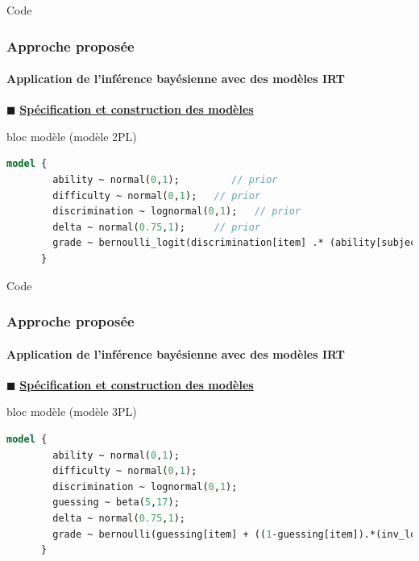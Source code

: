 \documentclass[aspectratio=169,professionalfonts, 12pt]{beamer}
\begin{document}

\begin{frame}[fragile]{Code}
  \frametitle{Approche proposée}
  \framesubtitle{Application de l'inférence bayésienne avec des modèles IRT}
  \justifying 
  \(\displaystyle \blacksquare \) \textbf{\underline{Spécification et construction des modèles}}
  \begin{minipage}{\textwidth}
  \begin{block}{bloc modèle (modèle 2PL)}
    \begin{lstlisting}[language=Stan,basicstyle=\scriptsize,framesep=4.5mm,framexleftmargin=2.5mm,tabsize=2]
      model {
        ability ~ normal(0,1);         // prior
        difficulty ~ normal(0,1);   // prior
        discrimination ~ lognormal(0,1);   // prior
        delta ~ normal(0.75,1);     // prior
        grade ~ bernoulli_logit(discrimination[item] .* (ability[subject] - (difficulty[item] + delta)));	
      }
    \end{lstlisting}
  \end{block}
  \end{minipage}
\end{frame}

\begin{frame}[fragile]{Code}
  \frametitle{Approche proposée}
  \framesubtitle{Application de l'inférence bayésienne avec des modèles IRT}
  \justifying 
  \(\displaystyle \blacksquare \) \textbf{\underline{Spécification et construction des modèles}}
  \begin{minipage}{\textwidth}
  \begin{block}{bloc modèle (modèle 3PL)}
    \begin{lstlisting}[language=Stan,basicstyle=\scriptsize,framesep=4.5mm,framexleftmargin=2.5mm,tabsize=2]
      model {
        ability ~ normal(0,1);         
        difficulty ~ normal(0,1);   
        discrimination ~ lognormal(0,1);
        guessing ~ beta(5,17);
        delta ~ normal(0.75,1);
        grade ~ bernoulli(guessing[item] + ((1-guessing[item]).*(inv_logit(discrimination[item] .* (ability[subject] - (difficulty[item] + delta))))));
      }
    \end{lstlisting}
  \end{block}
  \end{minipage}
\end{frame}
\end{document}

